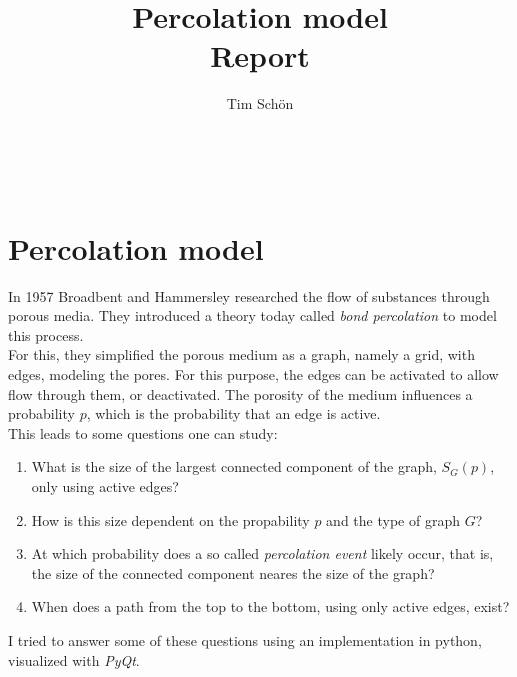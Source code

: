\documentclass[a4paper,fleqn]{article}
\begin{document}
\title{Percolation model\\ \Large{Report}}
\author{Tim Schön}
\date{}
\maketitle
\ \\

\section*{Percolation model}
In 1957 Broadbent and Hammersley researched the flow of substances through porous media. They introduced a theory today called \emph{bond percolation} to model this process. \cite{PercWW}\\
For this, they simplified the porous medium as a graph, namely a grid, with edges, modeling the pores. For this purpose, the edges can be activated to allow flow through them, or deactivated. The porosity of the medium influences a probability $p$, which is the probability that an edge is active. \cite{Percolation}\\
This leads to some questions one can study:
\begin{enumerate}
	\item What is the size of the largest connected component of the graph, $S_G(p)$, only using active edges? 
	\item How is this size dependent on the propability $p$ and the type of graph $G$?
	\item At which probability does a so called \emph{percolation event} likely occur, that is, the size of the connected component neares the size of the graph?
	\item When does a path from the top to the bottom, using only active edges, exist?
\end{enumerate}
I tried to answer some of these questions using an implementation in python, visualized with \emph{PyQt}.
\end{document}
